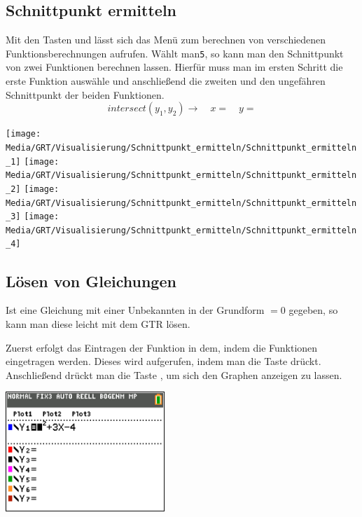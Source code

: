 \subsection{Schnittpunkt ermitteln}

\begin{paracol}{2}
\begin{flushleft}
	Mit den Tasten  und  lässt sich das Menü zum berechnen von verschiedenen Funktionsberechnungen aufrufen. Wählt man\texttt{5}, so kann man den Schnittpunkt von zwei Funktionen berechnen lassen. Hierfür muss man im ersten Schritt die erste Funktion auswähle und anschließend die zweiten und den ungefähren Schnittpunkt der beiden Funktionen.
	\[intersect(y_1,y_2)\rightarrow \quad x=\quad y=\]
	
\end{flushleft}
\switchcolumn
\begin{flushright}
	\texttt{[image: Media/GRT/Visualisierung/Schnittpunkt\_ermitteln/Schnittpunkt\_ermitteln\_1]}
	\texttt{[image: Media/GRT/Visualisierung/Schnittpunkt\_ermitteln/Schnittpunkt\_ermitteln\_2]}
	\texttt{[image: Media/GRT/Visualisierung/Schnittpunkt\_ermitteln/Schnittpunkt\_ermitteln\_3]}
	\texttt{[image: Media/GRT/Visualisierung/Schnittpunkt\_ermitteln/Schnittpunkt\_ermitteln\_4]}
\end{flushright}
\end{paracol}

\subsection{Lösen von Gleichungen}
Ist eine Gleichung mit einer Unbekannten in der Grundform $=0$ gegeben, so kann man diese leicht mit dem GTR lösen.

\begin{paracol}{2}
	\begin{flushleft}
	Zuerst erfolgt das Eintragen der Funktion in dem, indem die Funktionen eingetragen werden. Dieses wird aufgerufen, indem man die Taste  drückt.
		Anschließend drückt man die Taste , um sich den Graphen anzeigen zu lassen. 
	\end{flushleft}
\switchcolumn
	\begin{flushright}
	\includegraphics[width= 6cm]{Media/GRT/Visualisierung/loesen_gleichung/loesen_gleichung_1 .png}
		\end{flushright}
\end{paracol}


